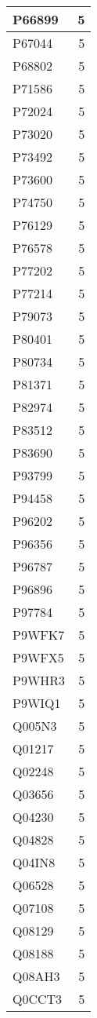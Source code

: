 \documentclass[
]{book}
\theoremstyle{definition}
\theoremstyle{definition}
\theoremstyle{definition}
\theoremstyle{definition}
\theoremstyle{remark}
\begin{document}
\begin{table}
\begin{tabular}{l|r}
\hline
P66899 & 5\\
\hline
P67044 & 5\\
\hline
P68802 & 5\\
\hline
P71586 & 5\\
\hline
P72024 & 5\\
\hline
P73020 & 5\\
\hline
P73492 & 5\\
\hline
P73600 & 5\\
\hline
P74750 & 5\\
\hline
P76129 & 5\\
\hline
P76578 & 5\\
\hline
P77202 & 5\\
\hline
P77214 & 5\\
\hline
P79073 & 5\\
\hline
P80401 & 5\\
\hline
P80734 & 5\\
\hline
P81371 & 5\\
\hline
P82974 & 5\\
\hline
P83512 & 5\\
\hline
P83690 & 5\\
\hline
P93799 & 5\\
\hline
P94458 & 5\\
\hline
P96202 & 5\\
\hline
P96356 & 5\\
\hline
P96787 & 5\\
\hline
P96896 & 5\\
\hline
P97784 & 5\\
\hline
P9WFK7 & 5\\
\hline
P9WFX5 & 5\\
\hline
P9WHR3 & 5\\
\hline
P9WIQ1 & 5\\
\hline
Q005N3 & 5\\
\hline
Q01217 & 5\\
\hline
Q02248 & 5\\
\hline
Q03656 & 5\\
\hline
Q04230 & 5\\
\hline
Q04828 & 5\\
\hline
Q04IN8 & 5\\
\hline
Q06528 & 5\\
\hline
Q07108 & 5\\
\hline
Q08129 & 5\\
\hline
Q08188 & 5\\
\hline
Q08AH3 & 5\\
\hline
Q0CCT3 & 5\\

\end{tabular}
\end{table}
\end{document}
